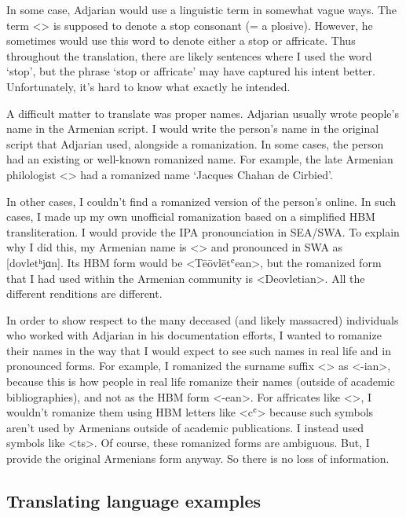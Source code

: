 In some case, Adjarian would use a linguistic term in somewhat vague ways. The term <> is supposed to denote a stop consonant (= a plosive). However, he sometimes would use this word to denote either a stop or affricate. Thus throughout the translation, there are likely sentences where I used the word `stop', but the phrase `stop  or affricate' may have captured his intent better. Unfortunately, it's hard to know what exactly he intended. 

A difficult matter to translate was proper names. Adjarian usually wrote people's name in the Armenian script. I would write the person's name in the original script that Adjarian used, alongside a romanization. In some cases, the person had an existing or well-known romanized name. For example, the late Armenian philologist <> had a romanized name `Jacques Chahan de Cirbied'. 

In other cases, I couldn't find a romanized version of the  person's online. In such cases, I made up my own unofficial romanization based on a simplified HBM transliteration. I would provide  the IPA pronounciation in SEA/SWA.  To explain why I did this, my Armenian name is <> and pronounced in SWA as [dovletʰjɑn]. Its HBM form would be <Tēōvlētʿean>, but the romanized form that I had used within the Armenian community is <Deovletian>.  All the different renditions are different.

In order  to show respect to the many deceased (and likely massacred) individuals who worked with Adjarian in his documentation efforts, I wanted to romanize their names in the way that I would expect to see such names in real life and in pronounced forms.  For example, I romanized the surname suffix <> as <-ian>, because this is how people in real life romanize their names (outside of academic bibliographies), and not as the HBM form <-ean>. For affricates like <>, I wouldn't romanize them using HBM letters like <cʿ> because such symbols aren't used by Armenians outside of academic publications. I instead used symbols like <ts>. Of course, these romanized forms are ambiguous. But, I provide the original Armenians form anyway. So there is no loss of information.






\subsection{Translating language examples}\label{sec:HossepIntro:translation:lang}

